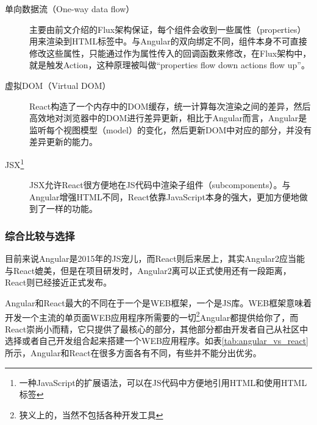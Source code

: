 \begin{description}
  \item[单向数据流（One-way data flow）] 主要由前文介绍的Flux架构保证，每个组件会收到一些属性（properties）用来渲染到HTML标签中。与Angular的双向绑定不同，组件本身不可直接修改这些属性，只能通过作为属性传入的回调函数来修改，在Flux架构中，就是触发Action，这种原理被叫做“properties flow down actions flow up”。
  \item[虚拟DOM（Virtual DOM）] React构造了一个内存中的DOM缓存，统一计算每次渲染之间的差异，然后高效地对浏览器中的DOM进行差异更新，相比于Angular而言，Angular是监听每个视图模型（model）的变化，然后更新DOM中对应的部分，并没有差异更新的能力。
  \item[JSX\footnote{一种JavaScript的扩展语法，可以在JS代码中方便地引用HTML和使用HTML标签}] JSX允许React很方便地在JS代码中渲染子组件（subcomponents）。与Angular增强HTML不同，React依靠JavaScript本身的强大，更加方便地做到了一样的功能。
\end{description}

\subsubsection{综合比较与选择}
目前来说Angular是2015年的JS宠儿，而React则后来居上，其实Angular2应当能与React媲美，但是在项目研发时，Angular2离可以正式使用还有一段距离，React则已经接近正式发布。

Angular和React最大的不同在于一个是WEB框架，一个是JS库。WEB框架意味着开发一个主流的单页面WEB应用程序所需要的一切\footnote{狭义上的，当然不包括各种开发工具}Angular都提供给你了，而React崇尚小而精，它只提供了最核心的部分，其他部分都由开发者自己从社区中选择或者自己开发组合起来搭建一个WEB应用程序。如表\ref{tab:angular_vs_react}所示，Angular和React在很多方面各有不同，有些并不能分出优劣。


